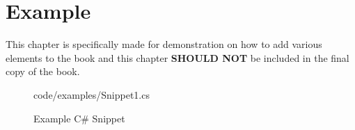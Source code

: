 \chapter{Example}

This chapter is specifically made for demonstration on how to add various elements to the book and this chapter \textbf{SHOULD NOT} be included in the final copy of the book.

\begin{figure}[h]
    \centering
    \colorbox{backgroundcolor}{
        \parbox{0.9\textwidth}{
            
            {code/examples/Snippet1.cs}
        }
    }
    \caption{Example C\# Snippet}
    \label{fig:example_cs_snippet}
\end{figure}


